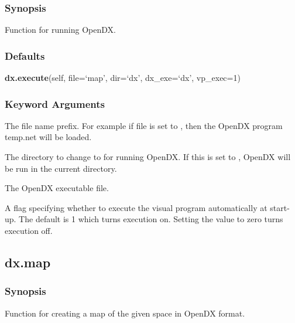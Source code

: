   
 \subsubsection{Synopsis} 

 Function for running OpenDX. 
  

  
 \subsubsection{Defaults} 

 \textsf{\textbf{dx.execute}(self, file=`map', dir=`dx', dx\_exe=`dx', vp\_exec=1)} 

  
 \subsubsection{Keyword Arguments} 

   The file name prefix.  For example if file is set to , then the OpenDX program temp.net will be loaded.   

   The directory to change to for running OpenDX.  If this is set to , OpenDX will be run in the current directory.   

   The OpenDX executable file.   

   A flag specifying whether to execute the visual program automatically at start-up.  The default is 1 which turns execution on.  Setting the value to zero turns execution off.  

  

  

 \newpage 

 \subsection{dx.map} 

  
 \subsubsection{Synopsis} 

 Function for creating a map of the given space in OpenDX format. 
  

